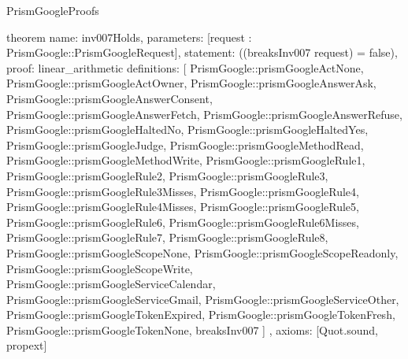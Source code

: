 \begin{lexlean}{PrismGoogleProofs}
\begin{semanticmodule}
theorem{
  name: inv007Holds,
  parameters: [request : PrismGoogle::PrismGoogleRequest],
  statement: ((breaksInv007 request) = false),
  proof: linear_arithmetic{
    definitions: [
      PrismGoogle::prismGoogleActNone,
      PrismGoogle::prismGoogleActOwner,
      PrismGoogle::prismGoogleAnswerAsk,
      PrismGoogle::prismGoogleAnswerConsent,
      PrismGoogle::prismGoogleAnswerFetch,
      PrismGoogle::prismGoogleAnswerRefuse,
      PrismGoogle::prismGoogleHaltedNo,
      PrismGoogle::prismGoogleHaltedYes,
      PrismGoogle::prismGoogleJudge,
      PrismGoogle::prismGoogleMethodRead,
      PrismGoogle::prismGoogleMethodWrite,
      PrismGoogle::prismGoogleRule1,
      PrismGoogle::prismGoogleRule2,
      PrismGoogle::prismGoogleRule3,
      PrismGoogle::prismGoogleRule3Misses,
      PrismGoogle::prismGoogleRule4,
      PrismGoogle::prismGoogleRule4Misses,
      PrismGoogle::prismGoogleRule5,
      PrismGoogle::prismGoogleRule6,
      PrismGoogle::prismGoogleRule6Misses,
      PrismGoogle::prismGoogleRule7,
      PrismGoogle::prismGoogleRule8,
      PrismGoogle::prismGoogleScopeNone,
      PrismGoogle::prismGoogleScopeReadonly,
      PrismGoogle::prismGoogleScopeWrite,
      PrismGoogle::prismGoogleServiceCalendar,
      PrismGoogle::prismGoogleServiceGmail,
      PrismGoogle::prismGoogleServiceOther,
      PrismGoogle::prismGoogleTokenExpired,
      PrismGoogle::prismGoogleTokenFresh,
      PrismGoogle::prismGoogleTokenNone,
      breaksInv007
    ]
  },
  axioms: [Quot.sound, propext]
}
\end{semanticmodule}
\end{lexlean}
